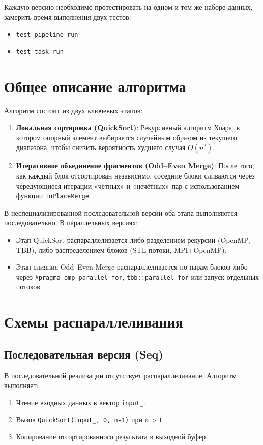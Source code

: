 \documentclass[12pt]{article}
\begin{document}
\hspace*{1.25em}Каждую версию необходимо протестировать на одном и том же наборе данных, замерить время выполнения двух тестов:
\begin{itemize}
    \item \texttt{test\_pipeline\_run}
    \item \texttt{test\_task\_run}
\end{itemize}

\section{Общее описание алгоритма}
\hspace*{1.25em}Алгоритм состоит из двух ключевых этапов:
\begin{enumerate}
    \item \textbf{Локальная сортировка (QuickSort)}: Рекурсивный алгоритм Хоара, в котором опорный элемент выбирается случайным образом из текущего диапазона, чтобы снизить вероятность худшего случая $O(n^2)$.
    \item \textbf{Итеративное объединение фрагментов (Odd–Even Merge)}: После того, как каждый блок отсортирован независимо, соседние блоки сливаются через чередующиеся итерации «чётных» и «нечётных» пар с использованием функции \texttt{InPlaceMerge}.
\end{enumerate}

\hspace*{1.25em}В неспециализированной последовательной версии оба этапа выполняются последовательно. В параллельных версиях:
\begin{itemize}
    \item Этап QuickSort распараллеливается либо разделением рекурсии (OpenMP, TBB), либо распределением блоков (STL-потоки, MPI+OpenMP).
    \item Этап слияния Odd–Even Merge распараллеливается по парам блоков либо через \texttt{\#pragma omp parallel for}, \texttt{tbb::parallel\_for} или запуск отдельных потоков.
\end{itemize}

\clearpage
\section{Схемы распараллеливания}

\subsection{Последовательная версия (Seq)}
\hspace*{1.25em}В последовательной реализации отсутствует распараллеливание. Алгоритм выполняет:
\begin{enumerate}
    \item Чтение входных данных в вектор \texttt{input\_}.
    \item Вызов \texttt{QuickSort(input\_, 0, n-1)} при $n>1$.
    \item Копирование отсортированного результата в выходной буфер.
\end{enumerate}
\end{document}
